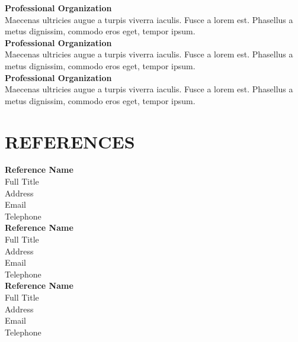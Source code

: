 \documentclass{article}
\begin{document}
\noindent
\newline
\textbf{Professional Organization} \\
Maecenas ultricies augue a turpis viverra iaculis. Fusce a lorem est. Phasellus a metus dignissim, commodo eros eget, tempor ipsum.  \\

\noindent
\textbf{Professional Organization} \\
Maecenas ultricies augue a turpis viverra iaculis. Fusce a lorem est. Phasellus a metus dignissim, commodo eros eget, tempor ipsum.  \\

\noindent
\textbf{Professional Organization} \\
Maecenas ultricies augue a turpis viverra iaculis. Fusce a lorem est. Phasellus a metus dignissim, commodo eros eget, tempor ipsum.  


\section*{REFERENCES}

\noindent
\newline
\textbf{Reference Name} \\
Full Title \\
Address\\
Email \\
Telephone \\

\noindent
\textbf{Reference Name} \\
Full Title \\
Address\\
Email \\
Telephone \\

\noindent
\textbf{Reference Name} \\
Full Title \\
Address\\
Email \\
Telephone \\


\end{document}
